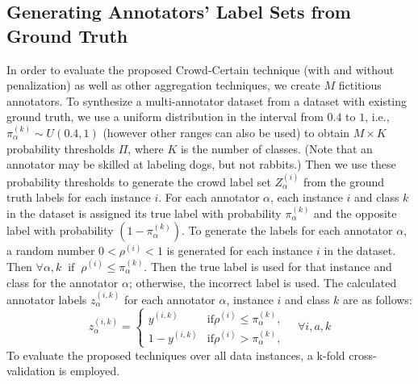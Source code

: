 \subsection{Generating Annotators' Label Sets from Ground Truth}\label{subsec:methods.generating_fictitious_labelset}
In order to evaluate the proposed Crowd-Certain technique (with and without penalization) as well as other aggregation techniques, we create $M$ fictitious annotators. To synthesize a multi-annotator dataset from a dataset with existing ground truth, we use a uniform distribution in the interval from $0.4 $ to $1 $, i.e., $\pi_\alpha^{(k)} \sim U\left(0.4,1\right) $ (however other ranges can also be used) to obtain $M \times  K$ probability thresholds $\Pi $, where $K$ is the number of classes. (Note that
an annotator may be skilled at labeling dogs, but not rabbits.) Then we use these probability thresholds to generate the crowd label set $Z_{\alpha}^{(i)} $ from the ground truth labels for each instance $i $.
For each annotator $\alpha $, each instance $i $ and class $k $ in the dataset is assigned its true label with probability $\pi_\alpha^{(k)}$ and the opposite label with probability $ (1-\pi_\alpha^{(k)})$. To generate the labels for each annotator $\alpha $, a random number $0 < \rho^{(i)} < 1 $ is generated for each instance $i $ in the dataset. Then $\forall \alpha,k \; \; \text{if} \; \; \rho^{(i)}\leq \pi_\alpha^{(k)}$. Then the true label is used for that instance and class for the annotator $\alpha $; otherwise, the incorrect label is used.
The calculated annotator labels $z_{\alpha}^{(i,k)} $ for each annotator $\alpha $, instance $i $ and class $k $ are as follows:
\begin{equation}
    z_{\alpha}^{(i,k)} =
    \begin{cases}
        y^{(i,k)} & \text{if} \rho^{(i)}  \leq \pi_\alpha^{(k)} , \\
        1 - y^{(i,k)} & \text{if} \rho^{(i)} > \pi_\alpha^{(k)} ,
    \end{cases} \quad \forall i, a, k
    \label{eq:crowd.Eq.4.fictitious_label}
\end{equation}
To evaluate the proposed techniques over all data instances, a k-fold cross-validation is employed.

